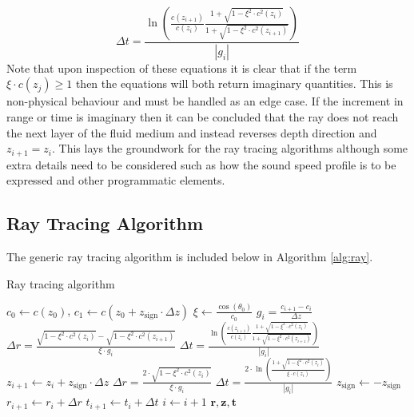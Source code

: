 \documentclass{article}
\begin{document}
\begin{equation}
  \label{eq:dt}
  \Delta t = \frac{\ln{\left( \frac{c(z_{i+1})}{c(z_i)}\frac{1 + \sqrt{1 - \xi^2\cdot c^2(z_i)}}{1 + \sqrt{1 - \xi^2\cdot c^2(z_{i+1})}} \right)}}{|g_i|}
\end{equation}
Note that upon inspection of these equations it is clear that if the term $\xi\cdot c(z_{j})\geq 1$ then the equations will both return imaginary quantities. This is non-physical behaviour and must be handled as an edge case. If the increment in range or time is imaginary then it can be concluded that the ray does not reach the next layer of the fluid medium and instead reverses depth direction and $z_{i+1}=z_i$. This lays the groundwork for the ray tracing algorithms although some extra details need to be considered such as how the sound speed profile is to be expressed and other programmatic elements.

\subsection{Ray Tracing Algorithm}
The generic ray tracing algorithm is included below in Algorithm \ref{alg:ray}.
\begin{algorithm}
  \caption{Ray tracing algorithm}\label{alg:ray}
  \begin{algorithmic}
    \State $c_0\gets c(z_0)$, $c_1\gets c(z_0+z_{\mathrm{sign}}\cdot\Delta z)$
    \State $\xi\gets \frac{\cos(\theta_0)}{c_0}$
      \State $g_i=\frac{c_{i+1} - c_i}{\Delta z}$
        \State $\Delta r = \frac{\sqrt{1-\xi^2\cdot c^2(z_i)} - \sqrt{1-\xi^2\cdot c^2(z_{i+1})}}{\xi\cdot g_i}$ 
        \State $\Delta t = \frac{\ln{\left( \frac{c(z_{i+1})}{c(z_i)}\frac{1 + \sqrt{1 - \xi^2\cdot c^2(z_i)}}{1 + \sqrt{1 - \xi^2\cdot c^2(z_{i+1})}} \right)}}{|g_i|}$
        \State $z_{i+1}\gets z_i+z_{\mathrm{sign}}\cdot\Delta z$
      \Else
        \State $\Delta r=\frac{2\cdot\sqrt{1-\xi^2\cdot c^2(z_i)}}{\xi\cdot g_i}$
        \State $\Delta t=\frac{2\cdot\ln{(\frac{1 + \sqrt{1-\xi^2\cdot c^2(z_i)}}{\xi\cdot c(z_i)})}}{|g_i|}$
        \State $z_{\mathrm{sign}}\gets-z_{\mathrm{sign}}$
      \EndIf
      \State $r_{i+1} \gets r_i + \Delta r$
      \State $t_{i+1}\gets t_i+\Delta t$
      \State $i\gets i+1$
    \EndWhile
    \Return $\bm{r}, \bm{z}, \bm{t}$
  \end{algorithmic}
\end{algorithm}
\end{document}
